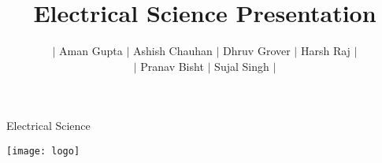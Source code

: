 \documentclass[11pt]{beamer}
\title{Electrical Science Presentation}
\author[Aman, Ashish, Dhruv...]
{\(|\) Aman Gupta \(|\) Ashish Chauhan \(|\) Dhruv Grover \(|\) Harsh Raj \(|\)\\\(|\) Pranav Bisht \(|\) Sujal Singh \(|\)}
\date[Harsh, Pranav, Sujal]{}
\begin{document}
    \begin{frame}{Electrical Science}
        \begin{center}
            \texttt{[image: logo]}
        \end{center}\vspace*{-18pt}
        \maketitle
    \end{frame}
\end{document}
